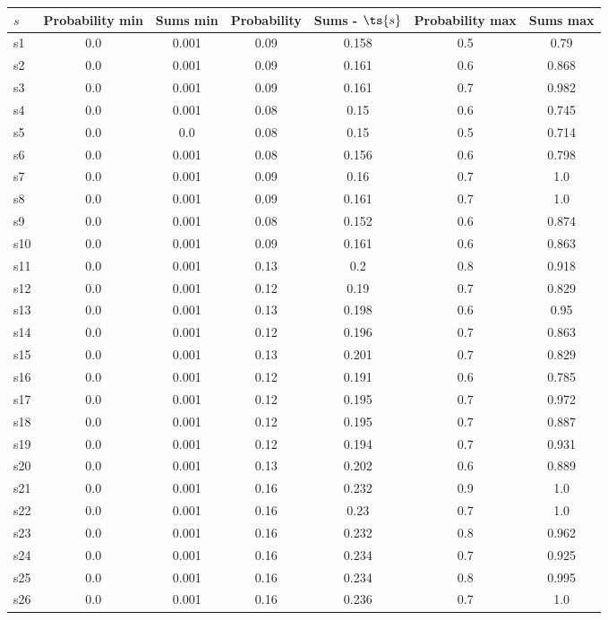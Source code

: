 \documentclass{article}
\begin{document}
\noindent\begin{tabular}{|l|c|c|c|c|c|c|}
\hline
$s$& Probability min & Sums min & Probability & Sums - $\ts{s}$ & Probability max & Sums max\\
\hline
s1 &0.0 & 0.001 & 0.09 & 0.158 & 0.5 & 0.79\\
\hline
s2 &0.0 & 0.001 & 0.09 & 0.161 & 0.6 & 0.868\\
\hline
s3 &0.0 & 0.001 & 0.09 & 0.161 & 0.7 & 0.982\\
\hline
s4 &0.0 & 0.001 & 0.08 & 0.15 & 0.6 & 0.745\\
\hline
s5 &0.0 & 0.0 & 0.08 & 0.15 & 0.5 & 0.714\\
\hline
s6 &0.0 & 0.001 & 0.08 & 0.156 & 0.6 & 0.798\\
\hline
s7 &0.0 & 0.001 & 0.09 & 0.16 & 0.7 & 1.0\\
\hline
s8 &0.0 & 0.001 & 0.09 & 0.161 & 0.7 & 1.0\\
\hline
s9 &0.0 & 0.001 & 0.08 & 0.152 & 0.6 & 0.874\\
\hline
s10 &0.0 & 0.001 & 0.09 & 0.161 & 0.6 & 0.863\\
\hline
s11 &0.0 & 0.001 & 0.13 & 0.2 & 0.8 & 0.918\\
\hline
s12 &0.0 & 0.001 & 0.12 & 0.19 & 0.7 & 0.829\\
\hline
s13 &0.0 & 0.001 & 0.13 & 0.198 & 0.6 & 0.95\\
\hline
s14 &0.0 & 0.001 & 0.12 & 0.196 & 0.7 & 0.863\\
\hline
s15 &0.0 & 0.001 & 0.13 & 0.201 & 0.7 & 0.829\\
\hline
s16 &0.0 & 0.001 & 0.12 & 0.191 & 0.6 & 0.785\\
\hline
s17 &0.0 & 0.001 & 0.12 & 0.195 & 0.7 & 0.972\\
\hline
s18 &0.0 & 0.001 & 0.12 & 0.195 & 0.7 & 0.887\\
\hline
s19 &0.0 & 0.001 & 0.12 & 0.194 & 0.7 & 0.931\\
\hline
s20 &0.0 & 0.001 & 0.13 & 0.202 & 0.6 & 0.889\\
\hline
s21 &0.0 & 0.001 & 0.16 & 0.232 & 0.9 & 1.0\\
\hline
s22 &0.0 & 0.001 & 0.16 & 0.23 & 0.7 & 1.0\\
\hline
s23 &0.0 & 0.001 & 0.16 & 0.232 & 0.8 & 0.962\\
\hline
s24 &0.0 & 0.001 & 0.16 & 0.234 & 0.7 & 0.925\\
\hline
s25 &0.0 & 0.001 & 0.16 & 0.234 & 0.8 & 0.995\\
\hline
s26 &0.0 & 0.001 & 0.16 & 0.236 & 0.7 & 1.0\\

\end{tabular}
\end{document}
